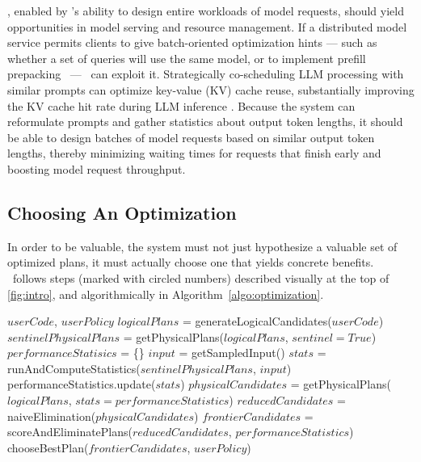 , enabled by \system's ability to design entire workloads of model requests, should yield opportunities in model serving and resource management. If a distributed model service permits clients to give batch-oriented optimization hints --- such as whether a set of queries will use the same model, or to implement prefill prepacking~\cite{zhao2024prepacking} --- \system\ can exploit it.  Strategically co-scheduling LLM processing with similar prompts can optimize key-value (KV) cache reuse, substantially improving the KV cache hit rate during LLM inference \cite{liu2024optimizing,ye2024cascade}. Because the system can reformulate prompts and gather statistics about output token lengths, it should be able to design batches of model requests based on similar output token lengths, thereby minimizing waiting times for requests that finish early and boosting model request throughput.  



\subsection{Choosing An Optimization}
\label{sec:choose-opt}
In order to be valuable, the system must not just hypothesize a valuable set of optimized plans, it must actually choose one that yields concrete benefits.  \system\ follows steps (marked with circled numbers) described visually at the top of \autoref{fig:intro}, and algorithmically in Algorithm~\ref{algo:optimization}.


\begin{algorithm}
\caption{Optimized Plan Selection Algorithm}
\label{algo:optimization}
\begin{algorithmic}[1]
\REQUIRE $userCode$, $userPolicy$ 
\STATE $logicalPlans$ = generateLogicalCandidates($userCode$) 
\STATE $sentinelPhysicalPlans$ = getPhysicalPlans($logicalPlans$, $sentinel=True$) 
\STATE
\STATE $performanceStatisics$ = \{\}
    \STATE $input$ = getSampledInput() 
    \STATE $stats$ = runAndComputeStatistics($sentinelPhysicalPlans$, $input$)  
    \STATE performanceStatistics.update($stats$) 
\ENDFOR
\STATE
\STATE $physicalCandidates$ = getPhysicalPlans($logicalPlans$, $stats=performanceStatistics$)
\STATE $reducedCandidates$ = naiveElimination($physicalCandidates$)
\STATE $frontierCandidates$ = scoreAndEliminatePlans($reducedCandidates$, $performanceStatistics$)
\STATE
\RETURN chooseBestPlan($frontierCandidates$, $userPolicy$) 
\end{algorithmic}
\end{algorithm}

